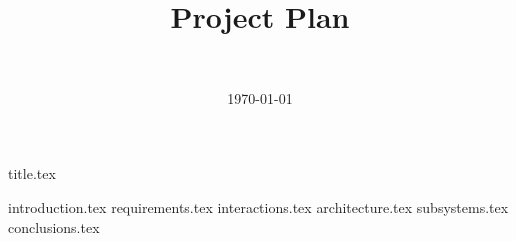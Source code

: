 \documentclass[final]{report}
\title{Project Plan}
\author{~}
\date{\today}
\begin{document}

{title.tex}
\newpage
\tableofcontents

\newpage
{}
{introduction.tex}
{requirements.tex}
{interactions.tex}
{architecture.tex}
{subsystems.tex}
{conclusions.tex}
\newpage
{}

\end{document}
